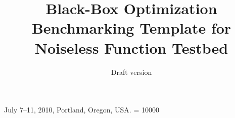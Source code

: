 \documentclass{sig-alternate}
\begin{document}
%
 {July 7--11, 2010, Portland, Oregon, USA.}
\widowpenalty = 10000

\title{Black-Box Optimization Benchmarking Template for Noiseless Function
Testbed
}
\subtitle{Draft version
}

%
%
%
%
%
\end{document}

